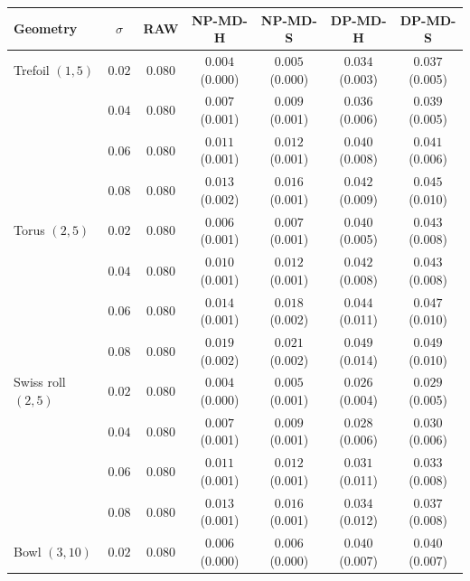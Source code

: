 \begin{tabular}{lcccccc}
\toprule
Geometry & $\sigma$ & RAW & NP-MD-H & NP-MD-S & DP-MD-H & DP-MD-S \\
\midrule
Trefoil $(1,5)$ & $0.02$ & $0.080$ & $0.004$ \scriptsize(0.000) & $0.005$ \scriptsize(0.000) & $0.034$ \scriptsize(0.003) & $0.037$ \scriptsize(0.005) \\
 & $0.04$ & $0.080$ & $0.007$ \scriptsize(0.001) & $0.009$ \scriptsize(0.001) & $0.036$ \scriptsize(0.006) & $0.039$ \scriptsize(0.005) \\
 & $0.06$ & $0.080$ & $0.011$ \scriptsize(0.001) & $0.012$ \scriptsize(0.001) & $0.040$ \scriptsize(0.008) & $0.041$ \scriptsize(0.006) \\
 & $0.08$ & $0.080$ & $0.013$ \scriptsize(0.002) & $0.016$ \scriptsize(0.001) & $0.042$ \scriptsize(0.009) & $0.045$ \scriptsize(0.010) \\
\midrule
Torus $(2,5)$ & $0.02$ & $0.080$ & $0.006$ \scriptsize(0.001) & $0.007$ \scriptsize(0.001) & $0.040$ \scriptsize(0.005) & $0.043$ \scriptsize(0.008) \\
 & $0.04$ & $0.080$ & $0.010$ \scriptsize(0.001) & $0.012$ \scriptsize(0.001) & $0.042$ \scriptsize(0.008) & $0.043$ \scriptsize(0.008) \\
 & $0.06$ & $0.080$ & $0.014$ \scriptsize(0.001) & $0.018$ \scriptsize(0.002) & $0.044$ \scriptsize(0.011) & $0.047$ \scriptsize(0.010) \\
 & $0.08$ & $0.080$ & $0.019$ \scriptsize(0.002) & $0.021$ \scriptsize(0.002) & $0.049$ \scriptsize(0.014) & $0.049$ \scriptsize(0.010) \\
\midrule
Swiss roll $(2,5)$ & $0.02$ & $0.080$ & $0.004$ \scriptsize(0.000) & $0.005$ \scriptsize(0.001) & $0.026$ \scriptsize(0.004) & $0.029$ \scriptsize(0.005) \\
 & $0.04$ & $0.080$ & $0.007$ \scriptsize(0.001) & $0.009$ \scriptsize(0.001) & $0.028$ \scriptsize(0.006) & $0.030$ \scriptsize(0.006) \\
 & $0.06$ & $0.080$ & $0.011$ \scriptsize(0.001) & $0.012$ \scriptsize(0.001) & $0.031$ \scriptsize(0.011) & $0.033$ \scriptsize(0.008) \\
 & $0.08$ & $0.080$ & $0.013$ \scriptsize(0.001) & $0.016$ \scriptsize(0.001) & $0.034$ \scriptsize(0.012) & $0.037$ \scriptsize(0.008) \\
\midrule
Bowl $(3,10)$ & $0.02$ & $0.080$ & $0.006$ \scriptsize(0.000) & $0.006$ \scriptsize(0.000) & $0.040$ \scriptsize(0.007) & $0.040$ \scriptsize(0.007) \\

\end{tabular}

